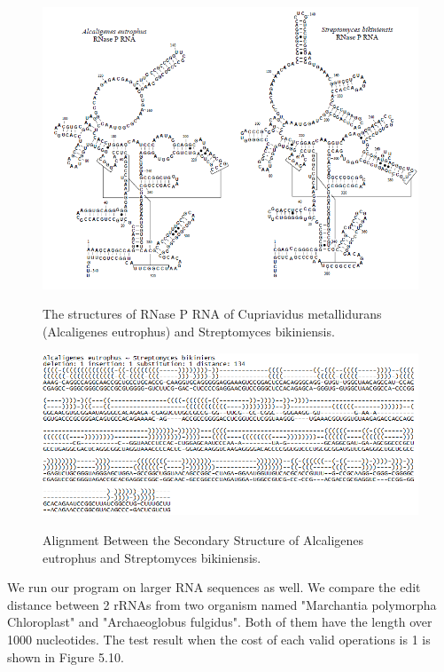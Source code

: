 \begin{figure}
		\centering
		\includegraphics[width=13cm,clip]{Figures/RNAGraphExample}
		\label{The structures of RNase P RNA of Cupriavidus metallidurans (Alcaligenes eutrophus) and Streptomyces bikiniensis.} 
		\caption{The structures of RNase P RNA of Cupriavidus metallidurans (Alcaligenes
eutrophus) and Streptomyces bikiniensis.}
\end{figure}

\begin{figure}
		\centering
		\includegraphics[width=17cm,clip]{Figures/AlignmentResult}
		\label{Alignment Between Two RNAs.} 
		\caption{Alignment Between the Secondary Structure of Alcaligenes eutrophus and Streptomyces bikiniensis.}
\end{figure}

We run our program on larger RNA sequences as well. We compare the edit distance between 2 rRNAs from two organism named "Marchantia polymorpha Chloroplast" and "Archaeoglobus fulgidus". Both of them have the length over 1000 nucleotides. The test result when the cost of each valid operations is 1 is shown in Figure 5.10. 

